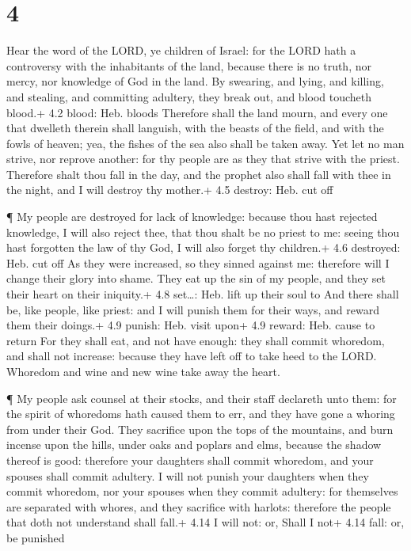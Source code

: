 \hypertarget{section-3}{%
\section{4}\label{section-3}}

 Hear the word of the LORD, ye children of Israel: for the
LORD hath a controversy with the inhabitants of the land, because there
is no truth, nor mercy, nor knowledge of God in the land. 
By swearing, and lying, and killing, and stealing, and committing
adultery, they break out, and blood toucheth blood.+ 4.2 blood: Heb.
bloods  Therefore shall the land mourn, and every one that
dwelleth therein shall languish, with the beasts of the field, and with
the fowls of heaven; yea, the fishes of the sea also shall be taken
away.  Yet let no man strive, nor reprove another: for thy
people are as they that strive with the priest.  Therefore
shalt thou fall in the day, and the prophet also shall fall with thee in
the night, and I will destroy thy mother.+ 4.5 destroy: Heb. cut off

 ¶ My people are destroyed for lack of knowledge: because
thou hast rejected knowledge, I will also reject thee, that thou shalt
be no priest to me: seeing thou hast forgotten the law of thy God, I
will also forget thy children.+ 4.6 destroyed: Heb. cut off 
As they were increased, so they sinned against me: therefore will I
change their glory into shame.  They eat up the sin of my
people, and they set their heart on their iniquity.+ 4.8 set\ldots: Heb.
lift up their soul to  And there shall be, like people, like
priest: and I will punish them for their ways, and reward them their
doings.+ 4.9 punish: Heb. visit upon+ 4.9 reward: Heb. cause to return
 For they shall eat, and not have enough: they shall commit
whoredom, and shall not increase: because they have left off to take
heed to the LORD.  Whoredom and wine and new wine take away
the heart.

 ¶ My people ask counsel at their stocks, and their staff
declareth unto them: for the spirit of whoredoms hath caused them to
err, and they have gone a whoring from under their God. 
They sacrifice upon the tops of the mountains, and burn incense upon the
hills, under oaks and poplars and elms, because the shadow thereof is
good: therefore your daughters shall commit whoredom, and your spouses
shall commit adultery.  I will not punish your daughters
when they commit whoredom, nor your spouses when they commit adultery:
for themselves are separated with whores, and they sacrifice with
harlots: therefore the people that doth not understand shall fall.+ 4.14
I will not: or, Shall I not+ 4.14 fall: or, be punished

